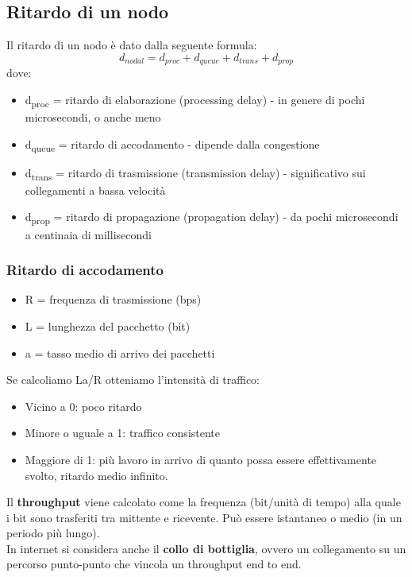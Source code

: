 \documentclass{report}
\begin{document}
	\subsection{Ritardo di un nodo}
	Il ritardo di un nodo è dato dalla seguente formula:
	\begin{equation}
		d_{nodal} = d_{proc}+d_{queue}+d_{trans}+d_{prop}
	\end{equation}
	dove:
	\begin{itemize}
		\item d\textsubscript{proc} = ritardo di elaborazione (processing delay)
		\subitem- in genere di pochi microsecondi, o anche meno
		\item d\textsubscript{queue} = ritardo di accodamento
		\subitem- dipende dalla congestione
		\item d\textsubscript{trans} = ritardo di trasmissione (transmission delay)
		\subitem- significativo sui collegamenti a bassa velocità
		\item d\textsubscript{prop} = ritardo di propagazione (propagation delay)
		\subitem- da pochi microsecondi a centinaia di millisecondi
	\end{itemize}
	\subsubsection{Ritardo di accodamento}
	\begin{itemize}
		\item R = frequenza di trasmissione (bps)
		\item L = lunghezza del pacchetto (bit)
		\item a = tasso medio di arrivo dei pacchetti
	\end{itemize}
	
	Se calcoliamo La/R otteniamo l'intensità di traffico:
	\begin{itemize}
		\item Vicino a 0: poco ritardo
		\item Minore o uguale a 1: traffico consistente
		\item Maggiore di 1: più lavoro in arrivo di quanto possa essere effettivamente svolto, ritardo medio infinito.
	\end{itemize}
	Il \textbf{throughput} viene calcolato come la frequenza (bit/unità di tempo) alla quale i bit sono trasferiti tra mittente e ricevente. Può essere istantaneo o medio (in un periodo più lungo).
	\medskip\\In internet si considera anche il \textbf{collo di bottiglia}, ovvero un collegamento su un percorso punto-punto che vincola un throughput end to end.
\end{document}
